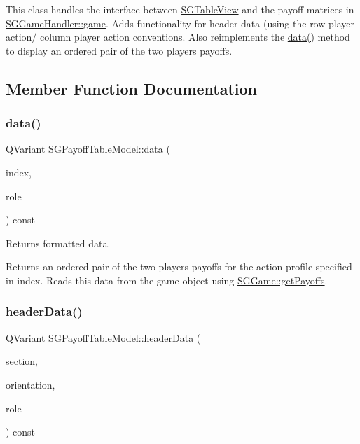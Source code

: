 This class handles the interface between \hyperlink{classSGTableView}{S\+G\+Table\+View} and the payoff matrices in \hyperlink{classSGGameHandler_ac95a8d363c98979cbbd8fc63a112bf11}{S\+G\+Game\+Handler\+::game}. Adds functionality for header data (using the row player action/ column player action conventions. Also reimplements the \hyperlink{classSGPayoffTableModel_ad47a81403a6442bd2fb879b52beea8c1}{data()} method to display an ordered pair of the two players\textquotesingle{} payoffs. 

\subsection{Member Function Documentation}
\mbox{\label{classSGPayoffTableModel_ad47a81403a6442bd2fb879b52beea8c1}} 
\subsubsection{\texorpdfstring{data()}{data()}}
{\footnotesize\ttfamily Q\+Variant S\+G\+Payoff\+Table\+Model\+::data (\begin{DoxyParamCaption}\item[{const Q\+Model\+Index \&}]{index,  }\item[{int}]{role }\end{DoxyParamCaption}) const}



Returns formatted data. 

Returns an ordered pair of the two players\textquotesingle{} payoffs for the action profile specified in index. Reads this data from the game object using \hyperlink{classSGGame_a37036f4f8389a68c53b12eb75c1eb7af}{S\+G\+Game\+::get\+Payoffs}. \mbox{\label{classSGPayoffTableModel_a8473c095d2a00721bd36c196f2b90b95}} 
\subsubsection{\texorpdfstring{header\+Data()}{headerData()}}
{\footnotesize\ttfamily Q\+Variant S\+G\+Payoff\+Table\+Model\+::header\+Data (\begin{DoxyParamCaption}\item[{int}]{section,  }\item[{Qt\+::\+Orientation}]{orientation,  }\item[{int}]{role }\end{DoxyParamCaption}) const}



